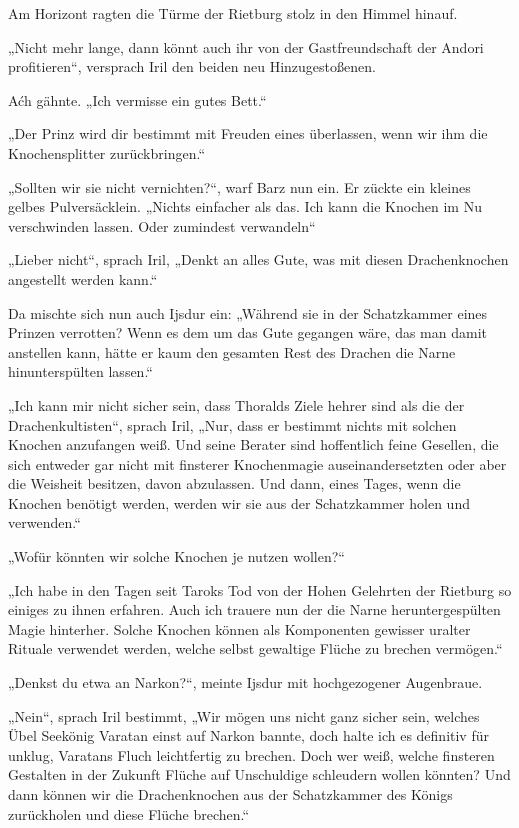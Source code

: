 Am Horizont ragten die Türme der Rietburg stolz in den Himmel hinauf.

„Nicht mehr lange, dann könnt auch ihr von der Gastfreundschaft der Andori profitieren“, versprach Iril den beiden neu Hinzugestoßenen.

Aćh gähnte. „Ich vermisse ein gutes Bett.“

„Der Prinz wird dir bestimmt mit Freuden eines überlassen, wenn wir ihm die Knochensplitter zurückbringen.“

„Sollten wir sie nicht vernichten?“, warf Barz nun ein. Er zückte ein kleines gelbes Pulversäcklein. „Nichts einfacher als das. Ich kann die Knochen im Nu verschwinden lassen. Oder zumindest verwandeln“

„Lieber nicht“, sprach Iril, „Denkt an alles Gute, was mit diesen Drachenknochen angestellt werden kann.“

Da mischte sich nun auch Ijsdur ein: „Während sie in der Schatzkammer eines Prinzen verrotten? Wenn es dem um das Gute gegangen wäre, das man damit anstellen kann, hätte er kaum den gesamten Rest des Drachen die Narne hinunterspülten lassen.“

„Ich kann mir nicht sicher sein, dass Thoralds Ziele hehrer sind als die der Drachenkultisten“, sprach Iril, „Nur, dass er bestimmt nichts mit solchen Knochen anzufangen weiß. Und seine Berater sind hoffentlich feine Gesellen, die sich entweder gar nicht mit finsterer Knochenmagie auseinandersetzten oder aber die Weisheit besitzen, davon abzulassen. Und dann, eines Tages, wenn die Knochen benötigt werden, werden wir sie aus der Schatzkammer holen und verwenden.“

„Wofür könnten wir solche Knochen je nutzen wollen?“

„Ich habe in den Tagen seit Taroks Tod von der Hohen Gelehrten der Rietburg so einiges zu ihnen erfahren. Auch ich trauere nun der die Narne heruntergespülten Magie hinterher. Solche Knochen können als Komponenten gewisser uralter Rituale verwendet werden, welche selbst gewaltige Flüche zu brechen vermögen.“

„Denkst du etwa an Narkon?“, meinte Ijsdur mit hochgezogener Augenbraue.

„Nein“, sprach Iril bestimmt, „Wir mögen uns nicht ganz sicher sein, welches Übel Seekönig Varatan einst auf Narkon bannte, doch halte ich es definitiv für unklug, Varatans Fluch leichtfertig zu brechen. Doch wer weiß, welche finsteren Gestalten in der Zukunft Flüche auf Unschuldige schleudern wollen könnten? Und dann können wir die Drachenknochen aus der Schatzkammer des Königs zurückholen und diese Flüche brechen.“\bigskip







